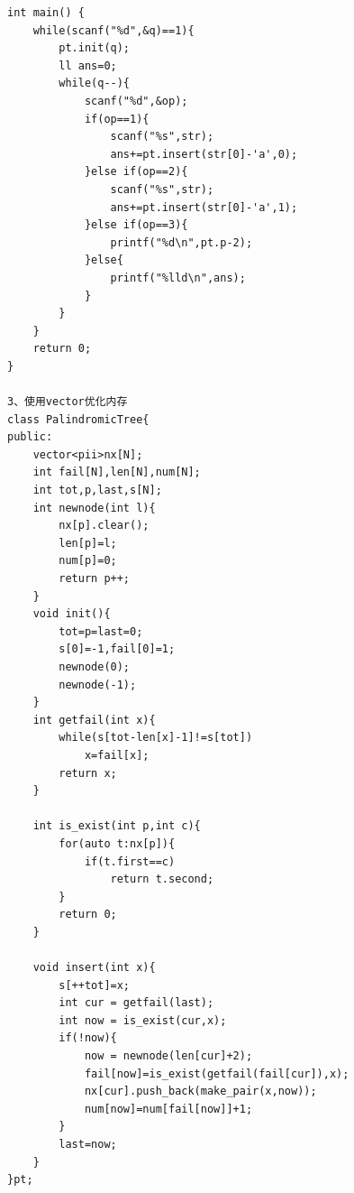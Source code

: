 \documentclass[twoside]{article}
\begin{document}
\begin{lstlisting}
int main() {
    while(scanf("%d",&q)==1){
        pt.init(q);
        ll ans=0;
        while(q--){
            scanf("%d",&op);
            if(op==1){
                scanf("%s",str);
                ans+=pt.insert(str[0]-'a',0);
            }else if(op==2){
                scanf("%s",str);
                ans+=pt.insert(str[0]-'a',1);
            }else if(op==3){
                printf("%d\n",pt.p-2);
            }else{
                printf("%lld\n",ans);
            }
        }
    }
    return 0;
}

3、使用vector优化内存
class PalindromicTree{
public:
    vector<pii>nx[N];
    int fail[N],len[N],num[N];
    int tot,p,last,s[N];
    int newnode(int l){
        nx[p].clear();
        len[p]=l;
        num[p]=0;
        return p++;
    }
    void init(){
        tot=p=last=0;
        s[0]=-1,fail[0]=1;
        newnode(0);
        newnode(-1);
    }
    int getfail(int x){
        while(s[tot-len[x]-1]!=s[tot])
            x=fail[x];
        return x;
    }

    int is_exist(int p,int c){
        for(auto t:nx[p]){
            if(t.first==c)
                return t.second;
        }
        return 0;
    }

    void insert(int x){
        s[++tot]=x;
        int cur = getfail(last);
        int now = is_exist(cur,x);
        if(!now){
            now = newnode(len[cur]+2);
            fail[now]=is_exist(getfail(fail[cur]),x);
            nx[cur].push_back(make_pair(x,now));
            num[now]=num[fail[now]]+1;
        }
        last=now;
    }
}pt;\end{lstlisting}
\end{document}
